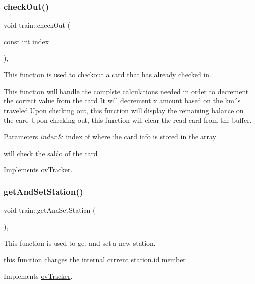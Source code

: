\subsubsection{\texorpdfstring{check\+Out()}{checkOut()}}
{\footnotesize\ttfamily void train\+::check\+Out (\begin{DoxyParamCaption}\item[{const int}]{index }\end{DoxyParamCaption})\hspace{0.3cm}{\ttfamily [override]}, {\ttfamily [virtual]}}



This function is used to checkout a card that has already checked in. 

This function will handle the complete calculations needed in order to decrement the correct value from the card It will decrement x amount based on the km´s traveled Upon checking out, this function will display the remaining balance on the card Upon checking out, this function will clear the read card from the buffer. 
\begin{DoxyParams}{Parameters}
{\em index} & index of where the card info is stored in the array \\
\hline
\end{DoxyParams}
will check the saldo of the card 

Implements \hyperlink{classovTracker_a96e808776b864290f742f271e18c401c}{ov\+Tracker}.

\mbox{\label{classtrain_a76824298a986f6a897b3e7cba2c8f15d}} 
\subsubsection{\texorpdfstring{get\+And\+Set\+Station()}{getAndSetStation()}}
{\footnotesize\ttfamily void train\+::get\+And\+Set\+Station (\begin{DoxyParamCaption}{ }\end{DoxyParamCaption})\hspace{0.3cm}{\ttfamily [override]}, {\ttfamily [virtual]}}



This function is used to get and set a new station. 

this function changes the internal current station.\+id member 

Implements \hyperlink{classovTracker_ae570f702740648f2994a0159616fa763}{ov\+Tracker}.

